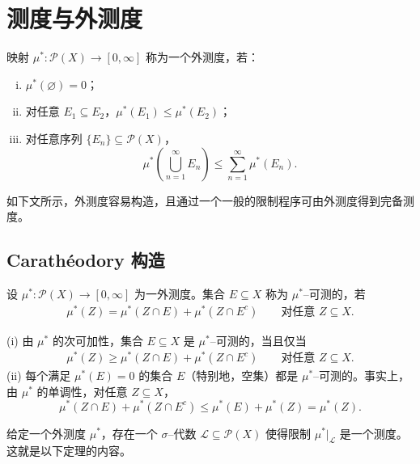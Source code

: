 \documentclass[../../main.tex]{subfiles}%
\begin{document}
\section{测度与外测度}\label{section:ch01-测度与外测度}

\begin{definition}\label{definition:ch01-外测度}
映射 $\mu^*:\mathcal{P}(X)\to[0,\infty]$ 称为一个外测度，若：
\begin{enumerate}[(i)]
\item $\mu^*(\varnothing )=0$；
\item 对任意 $E_1\subseteq E_2$，$\mu^*(E_1)\leqslant\mu^*(E_2)$；
\item 对任意序列 $\{E_n\}\subseteq\mathcal{P}(X)$，
\[
\mu^*\left(\bigcup_{n=1}^\infty E_n\right)\leqslant\sum_{n=1}^\infty\mu^*(E_n).
\]
\end{enumerate}
\end{definition}

如下文所示，外测度容易构造，且通过一个一般的限制程序可由外测度得到完备测度。

\subsection{Carathéodory 构造}\label{subsection:ch01-Caratheodory构造}

\begin{definition}\label{definition:ch01-外测度可测}
设 $\mu^*:\mathcal{P}(X)\to[0,\infty]$ 为一外测度。集合 $E\subseteq X$ 称为 $\mu^*$--可测的，若
\begin{align}
\mu^*(Z)=\mu^*(Z\cap E)+\mu^*(Z\cap E^c)\qquad\text{对任意 }Z\subseteq X. \label{align:ch01-Caratheodory条件}
\end{align}
\end{definition}

\begin{remark}\label{remark:ch01-外测度可测}
(i) 由 $\mu^*$ 的次可加性，集合 $E\subseteq X$ 是 $\mu^*$--可测的，当且仅当
\begin{align}
\mu^*(Z)\geqslant\mu^*(Z\cap E)+\mu^*(Z\cap E^c)\qquad\text{对任意 }Z\subseteq X. \label{align:ch01-Caratheodory等价}
\end{align}
(ii) 每个满足 $\mu^*(E)=0$ 的集合 $E$（特别地，空集）都是 $\mu^*$--可测的。事实上，由 $\mu^*$ 的单调性，对任意 $Z\subseteq X$，
\[
\mu^*(Z\cap E)+\mu^*(Z\cap E^c)\leqslant\mu^*(E)+\mu^*(Z)=\mu^*(Z).
\]
\end{remark}

给定一个外测度 $\mu^*$，存在一个 $\sigma$--代数 $\mathcal{L}\subseteq\mathcal{P}(X)$ 使得限制 $\mu^*|_{\mathcal{L}}$ 是一个测度。这就是以下定理的内容。
\end{document}

